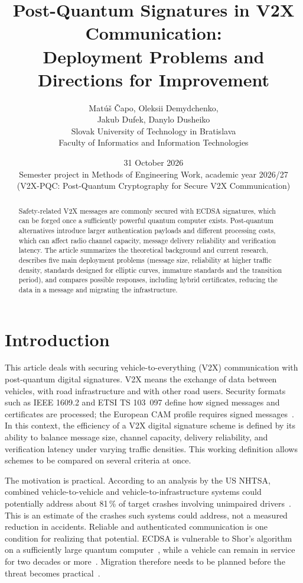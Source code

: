 \documentclass[11pt,a4paper]{article}
\title{\textbf{Post-Quantum Signatures in V2X Communication:\\
Deployment Problems and Directions for Improvement}}
\author{Mat\'u\v{s} \v{C}apo, Oleksii Demydchenko,\\
Jakub Dufek, Danylo Dusheiko\\[0.6em]
Slovak University of Technology in Bratislava\\
Faculty of Informatics and Information Technologies}
\date{31 October 2026\\[0.8em]
Semester project in Methods of Engineering Work, academic year 2026/27\\
(V2X-PQC: Post-Quantum Cryptography for Secure V2X Communication)}
\begin{document}
\maketitle

\begin{abstract}
\noindent
Safety-related V2X messages are commonly secured with ECDSA signatures, which can
be forged once a sufficiently powerful quantum computer exists. Post-quantum alternatives
introduce larger authentication payloads and different processing costs, which can affect radio
channel capacity, message delivery reliability and verification latency. The article summarizes
the theoretical background and current research, describes five main deployment problems
(message size, reliability at higher traffic density, standards designed for elliptic curves,
immature standards and the transition period), and compares possible responses, including
hybrid certificates, reducing the data in a message and migrating the infrastructure.
\end{abstract}

\section{Introduction}
\label{sec:intro}

This article deals with securing vehicle-to-everything (V2X) communication with post-quantum
digital signatures. V2X means the exchange of data between vehicles, with road infrastructure
and with other road users. Security formats such as IEEE 1609.2 and ETSI TS 103~097 define
how signed messages and certificates are processed; the European CAM profile requires signed
messages~\cite{etsi097r2,ieee1609}. In this context, the efficiency of a V2X digital signature
scheme is defined by its ability to balance message size, channel capacity, delivery reliability,
and verification latency under varying traffic densities. This working definition allows schemes
to be compared on several criteria at once.

The motivation is practical. According to an analysis by the US NHTSA, combined
vehicle-to-vehicle and vehicle-to-infrastructure systems could potentially address about
81\,\% of target crashes involving unimpaired drivers~\cite{najm}. This is an estimate of the
crashes such systems could address, not a measured reduction in accidents. Reliable and
authenticated communication is one condition for realizing that potential. ECDSA is vulnerable
to Shor's algorithm on a sufficiently large quantum computer~\cite{shor}, while a vehicle can
remain in service for two decades or more~\cite{yoshizawa22}. Migration therefore needs to be
planned before the threat becomes practical~\cite{mosca}.
\vspace{5cm}
\end{document}
